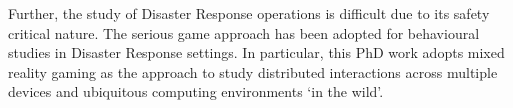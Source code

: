 Further, the study of Disaster Response operations is difficult due to its safety critical nature. The serious game approach has been adopted for behavioural studies in Disaster Response settings. In particular, this PhD work adopts mixed reality gaming as the  approach to study distributed interactions across multiple devices and ubiquitous computing environments `in the wild'. \\


